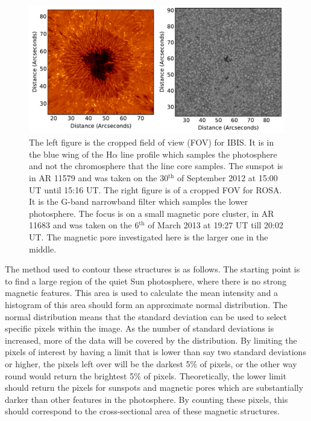     \begin{figure}
        \centering
        \includegraphics[width=\textwidth]{overview.pdf}
        \caption{
                The left figure is the cropped field of view (FOV) for IBIS.
                It is in the blue wing of the H$\alpha$ line profile which samples the photosphere and not the chromosphere that the line core samples.
                The sunspot is in AR 11579 and was taken on the 30$^{\mathrm{th}}$ of September 2012 at 15:00 UT until 15:16 UT.
                The right figure is of a cropped FOV for ROSA.
                It is the G-band narrowband filter which samples the lower photosphere.
                The focus is on a small magnetic pore cluster, in AR 11683 and was taken on the 6$^{\mathrm{th}}$ of March 2013 at 19:27 UT till 20:02 UT.
                The magnetic pore investigated here is the larger one in the middle.
                }
        \label{fig:data_overview}
    \end{figure}
        
    The method used to contour these structures is as follows.
    The starting point is to find a large region of the quiet Sun photosphere, where there is no strong magnetic features.
    This area is used to calculate the mean intensity and a histogram of this area should form an approximate normal distribution.
    The normal distribution means that the standard deviation can be used to select specific pixels within the image.
    As the number of standard deviations is increased, more of the data will be covered by the distribution.
    By limiting the pixels of interest by having a limit that is lower than say two standard deviations or higher, the pixels left over will be the darkest 5\% of pixels, or the other way round would return the brightest 5\% of pixels.
    Theoretically, the lower limit should return the pixels for sunspots and magnetic pores which are substantially darker than other features in the photosphere.
    By counting these pixels, this should correspond to the cross-sectional area of these magnetic structures.
    

